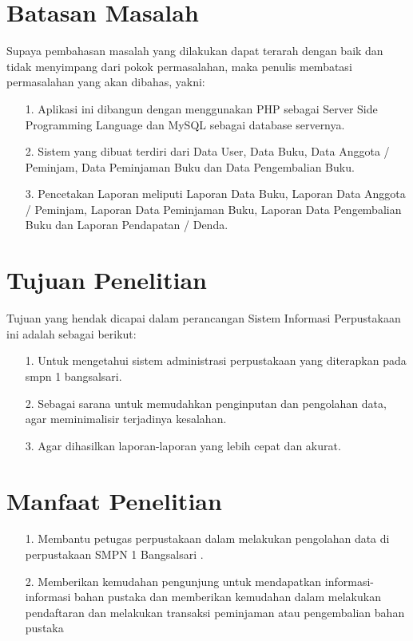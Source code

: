 \documentclass{jtetiproposalskripsi}
\begin{document}
\section{Batasan Masalah}
Supaya pembahasan masalah yang dilakukan dapat terarah dengan baik dan tidak menyimpang dari pokok permasalahan, maka penulis membatasi permasalahan yang akan dibahas, yakni:
\begin{itemize}
\item[1.]Aplikasi ini dibangun dengan menggunakan PHP sebagai Server Side Programming Language dan MySQL sebagai database servernya.
\item[2.]Sistem yang dibuat terdiri dari Data User, Data Buku, Data Anggota / Peminjam, Data Peminjaman Buku dan Data Pengembalian Buku.
\item[3.]Pencetakan Laporan meliputi Laporan Data Buku, Laporan Data Anggota / Peminjam, Laporan Data Peminjaman Buku, Laporan Data Pengembalian Buku dan Laporan Pendapatan / Denda.
\end{itemize}


\section{Tujuan Penelitian}
Tujuan yang hendak dicapai dalam perancangan Sistem Informasi Perpustakaan ini adalah sebagai berikut:
\begin{itemize}
\item[1.]Untuk mengetahui sistem administrasi perpustakaan yang diterapkan pada smpn 1 bangsalsari.
\item[2.]Sebagai sarana untuk memudahkan penginputan dan pengolahan data, agar meminimalisir terjadinya kesalahan.
\item[3.]Agar dihasilkan laporan-laporan yang lebih cepat dan akurat.
\end{itemize}


\section{Manfaat Penelitian}
\begin{itemize}
\item[1.]Membantu petugas perpustakaan dalam melakukan pengolahan data di
perpustakaan SMPN 1 Bangsalsari .
\item[2.]Memberikan kemudahan pengunjung untuk mendapatkan informasi-informasi
bahan pustaka dan memberikan kemudahan dalam melakukan pendaftaran
dan melakukan transaksi peminjaman atau pengembalian bahan pustaka
\end{itemize}
\end{document}
